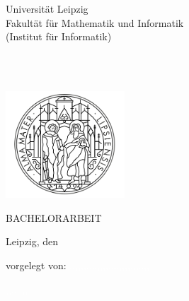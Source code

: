 \begin{titlepage}
	\begin{addmargin}[-1cm]{-3cm}
    \begin{center}
        \large

        \hfill

        \vfill
        
        Universität Leipzig\\
        Fakultät für Mathematik und Informatik\\
        (Institut für Informatik)\\
        
        \vfill

        \begingroup
            \color{Maroon}\LARGE{\spacedallcaps{\myTitle}} \\ \bigskip
            \large{\spacedallcaps{\mySubtitle}}\\ \bigskip
        \endgroup
        
        \vfill
        
        \includegraphics[height=4cm]{gfx/uni-leipzig-logo-pur.png} \\ \medskip %
        
        \vfill

        

        {\Huge BACHELORARBEIT} \bigskip

        \vfill
        
    \end{center}

        Leipzig, den \myTime \\ \medskip
        
    \begin{flushright}
        vorgelegt von: \textcolor{white}{,,,,,,,,,,,,,,,,,,,,,,,,,,,,,} \\
        \vspace{2pt}
        
        \noindent
         \textcolor{white}{,,,,,,,,}\\ 
        \vspace{4pt}
        

\end{flushright}
\end{addmargin}
\end{titlepage}
